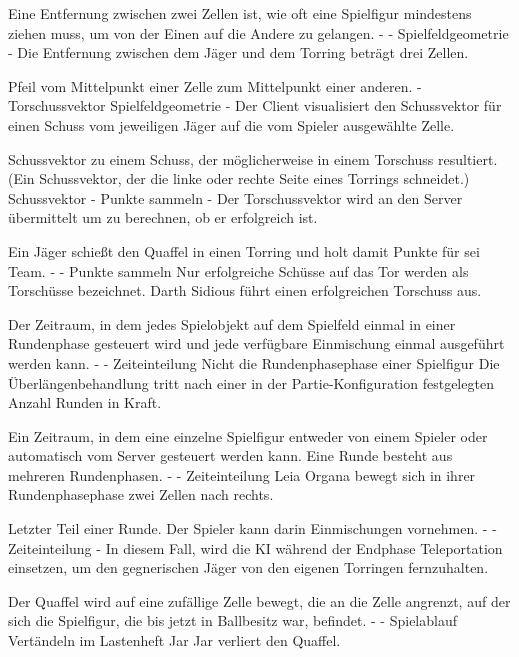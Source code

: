 {Eine Entfernung zwischen zwei Zellen ist, wie oft eine Spielfigur mindestens ziehen muss, um von der Einen auf die Andere zu  gelangen.}
{-}
{-}
{Spielfeldgeometrie}
{-}
{Die Entfernung zwischen dem Jäger und dem Torring beträgt drei Zellen.}

{Pfeil vom Mittelpunkt einer Zelle zum Mittelpunkt einer anderen.}
{-}
{Torschussvektor}
{Spielfeldgeometrie}
{-}
{Der Client visualisiert den Schussvektor für einen Schuss vom jeweiligen Jäger auf die vom Spieler ausgewählte Zelle.}

{Schussvektor zu einem Schuss, der möglicherweise in einem Torschuss resultiert. (Ein Schussvektor, der die linke oder rechte Seite eines Torrings schneidet.)}
{Schussvektor}
{-}
{Punkte sammeln}
{-}
{Der Torschussvektor wird an den Server übermittelt um zu berechnen, ob er erfolgreich ist.}

{Ein Jäger schießt den Quaffel in einen Torring und holt damit Punkte für sei Team.}
{-}
{-}
{Punkte sammeln}
{Nur erfolgreiche Schüsse auf das Tor werden als Torschüsse bezeichnet.}
{Darth Sidious führt einen erfolgreichen Torschuss aus.}

{Der Zeitraum, in dem jedes Spielobjekt auf dem Spielfeld einmal in einer Rundenphase gesteuert wird und jede verfügbare Einmischung einmal ausgeführt werden kann.}
{-}
{-}
{Zeiteinteilung}
{Nicht die Rundenphasephase einer Spielfigur}
{Die Überlängenbehandlung tritt nach einer in der Partie-Konfiguration festgelegten Anzahl Runden in Kraft.}

{Ein Zeitraum, in dem eine einzelne Spielfigur entweder von einem Spieler oder automatisch vom Server gesteuert werden kann. Eine Runde besteht aus mehreren Rundenphasen.}
{-}
{-}
{Zeiteinteilung}
{}
{Leia Organa bewegt sich in ihrer Rundenphasephase zwei Zellen nach rechts.}

{Letzter Teil einer Runde. Der Spieler kann darin Einmischungen vornehmen.}
{-}
{-}
{Zeiteinteilung}
{-}
{In diesem Fall, wird die KI während der Endphase Teleportation einsetzen, um den gegnerischen Jäger von den eigenen Torringen fernzuhalten.}

{Der Quaffel wird auf eine zufällige Zelle bewegt, die an die Zelle angrenzt, auf der sich die Spielfigur, die bis jetzt in Ballbesitz war, befindet.}
{-}
{-}
{Spielablauf}
{\glqq{}Vertändeln\grqq{}  im Lastenheft}
{Jar Jar verliert den Quaffel.}

